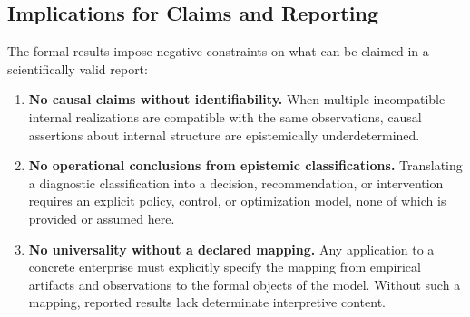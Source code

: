 \subsection{Implications for Claims and Reporting}
\label{subsec:imp-claims-reporting}

The formal results impose negative constraints on what can be claimed in a
scientifically valid report:

\begin{enumerate}
  \item \textbf{No causal claims without identifiability.}
  When multiple incompatible internal realizations are compatible with the same
  observations, causal assertions about internal structure are epistemically
  underdetermined.

  \item \textbf{No operational conclusions from epistemic classifications.}
  Translating a diagnostic classification into a decision, recommendation, or
  intervention requires an explicit policy, control, or optimization model,
  none of which is provided or assumed here.

  \item \textbf{No universality without a declared mapping.}
  Any application to a concrete enterprise must explicitly specify the mapping
  from empirical artifacts and observations to the formal objects of the model.
  Without such a mapping, reported results lack determinate interpretive content.
\end{enumerate}
